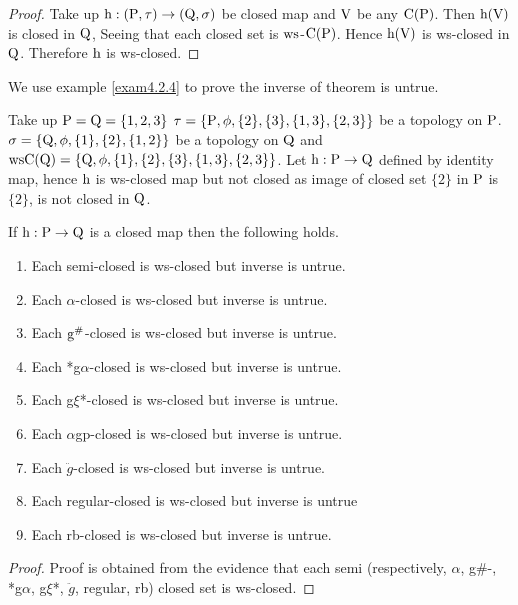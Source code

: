 \begin{proof}
Take up $\mathrm{h}: (\mathrm{P},\tau)\to (\mathrm{Q}, \sigma)$ be closed map and $\mathrm{V}$ be any $\mathrm{C}(\mathrm{P})$. Then $\mathrm{h}(\mathrm{V})$ is closed in $\mathrm{Q}$, Seeing that each closed set is $\mathrm{ws}$-$\mathrm{C}(\mathrm{P})$. Hence $\mathrm{h}(\mathrm{V})$ is ws-closed in $\mathrm{Q}$. Therefore $\mathrm{h}$ is ws-closed.
\end{proof}

We use example \ref{exam4.2.4} to prove the inverse of theorem is untrue.

\begin{exm}\label{exam4.2.4}
Take up $\mathrm{P} = \mathrm{Q} = \{1, 2, 3\}$ $\tau = \{\mathrm{P}, \phi, \{2\},\{3\},\{1,3\},\{2, 3\}\}$ be a topology on $\mathrm{P}$. $\sigma =\{\mathrm{Q}, \phi, \{1\},\{2\},\{1, 2\}\}$ be a topology on $\mathrm{Q}$ and $\mathrm{ws}\mathrm{C}(\mathrm{Q}) =\{\mathrm{Q}, \phi,\{1\}, \{2\},\{3\},\{1,3\},\{2,3\}\}$. Let $\mathrm{h}: \mathrm{P} \to \mathrm{Q}$ defined by identity map, hence $\mathrm{h}$ is ws-closed map but not closed as image of closed set $\{2\}$ in $\mathrm{P}$ is $\{2\}$, is not closed in $\mathrm{Q}$.
\end{exm}

\begin{thm}\label{thm4.2.5}
If $\mathrm{h}: \mathrm{P}\to \mathrm{Q}$ is a closed map then the following holds.
\begin{enumerate}[(1)]
\item Each semi-closed is ws-closed but inverse is untrue.
\item Each $\alpha$-closed is ws-closed but inverse is untrue.
\item Each $\mathrm{g}^{\#}$-closed is ws-closed but inverse is untrue.
\item Each *g$\alpha$-closed is ws-closed but inverse is untrue.
\item Each g$\xi$*-closed is ws-closed but inverse is untrue.
\item Each $\alpha$gp-closed is ws-closed but inverse is untrue.
\item Each $\ddot{g}$-closed is ws-closed but inverse is untrue.
\item Each regular-closed is ws-closed but inverse is untrue
\item Each rb-closed is ws-closed but inverse is untrue.
\end{enumerate}
\end{thm}

\begin{proof}
Proof is obtained from the evidence that each semi (respectively, $\alpha$, g\#-, *g$\alpha$, g$\xi$*, $\ddot{g}$, regular, rb) closed set is ws-closed.
\end{proof}

